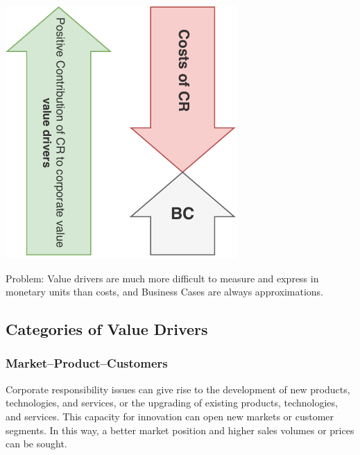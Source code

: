 \documentclass[11pt]{article}
\theoremstyle{definition}
\begin{document}
\vspace{1em}
\noindent
\begin{minipage}{0.35\linewidth}
	\centering
	\includegraphics[width=\linewidth]{img/CR_difficulties.pdf}
\end{minipage}
\hfill
\begin{minipage}{0.6\linewidth}
	Problem: Value drivers are much more difficult to measure and express in monetary units than costs, and Business Cases are always approximations.
\end{minipage}

\subsection{Categories of Value Drivers}
\subsubsection{Market–Product–Customers}
Corporate responsibility issues can give rise to the development of new products, technologies, and services, or the upgrading of existing products, technologies, and services. This capacity for innovation can open new markets or customer segments. In this way, a better market position and higher sales volumes or prices can be sought.
\end{document}
